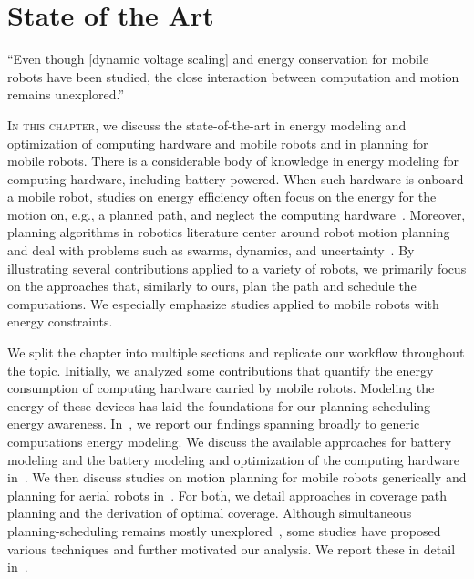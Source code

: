 %
%
%
%
\chapter{State of the Art}
\label{cp:soa}

\begin{chapquote}{\cite{brateman2006energy}}
  ``Even though [dynamic voltage scaling] and energy conservation for mobile robots have been studied, the close interaction between computation and motion remains unexplored.''
\end{chapquote}

\vspace*{1em}

\lettrine{I}{n this chapter}, we discuss the state-of-the-art in energy modeling and optimization of computing hardware and mobile robots and in planning for mobile robots. There is a considerable body of knowledge in energy modeling for computing hardware, including battery-powered. When such hardware is onboard a mobile robot, studies on energy efficiency often focus on the energy for the motion on, e.g., a planned path, and neglect the computing hardware~\citep{ondruska2015scheduled}. Moreover, planning algorithms in robotics literature center around robot motion planning and deal with problems such as swarms, dynamics, and uncertainty~\citep{lavalle2006planning}. By illustrating several contributions applied to a variety of robots, we primarily focus on the approaches that, similarly to ours, plan the path and schedule the computations. We especially emphasize studies applied to mobile robots with energy constraints.

We split the chapter into multiple sections and replicate our workflow throughout the topic. Initially, we analyzed some contributions that quantify the energy consumption of computing hardware carried by mobile robots. Modeling the energy of these devices has laid the foundations for our planning-scheduling energy awareness. In~, we report our findings spanning broadly to generic computations energy modeling. We discuss the available approaches for battery modeling and the battery modeling and optimization of the computing hardware in~. We then discuss studies on motion planning for mobile robots generically and planning for aerial robots in~. For both, we detail approaches in coverage path planning and the derivation of optimal coverage. Although simultaneous planning-scheduling remains mostly unexplored~\citep{brateman2006energy,ondruska2015scheduled,sudhakar2020balancing}, some studies have proposed various techniques and further motivated our analysis. We report these in detail in~.

